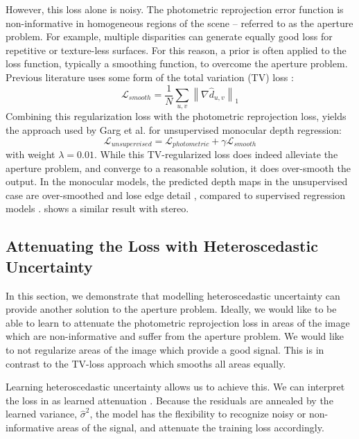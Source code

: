However, this loss alone is noisy. The photometric reprojection error function is non-informative in homogeneous regions of the scene \citep{hartley2000} -- referred to as the aperture problem. For example, multiple disparities can generate equally good loss for repetitive or texture-less surfaces. For this reason, a prior is often applied to the loss function, typically a smoothing function, to overcome the aperture problem. Previous literature \citep{garg2016unsupervised} uses some form of the total variation (TV) loss \citep{rudin1992nonlinear}:
\begin{equation}
\mathcal{L}_{smooth} = \frac{1}{N} \sum\limits_{u,v} \left\lVert \nabla\hat{d}_{u,v} \right\rVert_1
\end{equation}
Combining this regularization loss with the photometric reprojection loss, yields the approach used by Garg et al. \citep{garg2016unsupervised} for unsupervised monocular depth regression:
\begin{equation}
\mathcal{L}_{unsupervised} = \mathcal{L}_{photometric} + \gamma \mathcal{L}_{smooth}
\label{eqn:smooth_loss}
\end{equation}
with weight $\lambda=0.01$. While this TV-regularized loss does indeed alleviate the aperture problem, and converge to a reasonable solution, it does over-smooth the output. In the monocular models, the predicted depth maps in the unsupervised case are over-smoothed and lose edge detail \citep{garg2016unsupervised}, compared to supervised regression models \citep{eigen2014depth}.  shows a similar result with stereo.

\subsection{Attenuating the Loss with Heteroscedastic \\Uncertainty}

In this section, we demonstrate that modelling heteroscedastic uncertainty can provide another solution to the aperture problem. Ideally, we would like to be able to learn to attenuate the photometric reprojection loss in areas of the image which are non-informative and suffer from the aperture problem. We would like to not regularize areas of the image which provide a good signal. This is in contrast to the TV-loss approach which smooths all areas equally.

Learning heteroscedastic uncertainty allows us to achieve this. We can interpret the loss in  as learned attenuation \citep{kendall2017uncertainties}. Because the residuals are annealed by the learned variance, $\hat{\sigma}^2$, the model has the flexibility to recognize noisy or non-informative areas of the signal, and attenuate the training loss accordingly.

